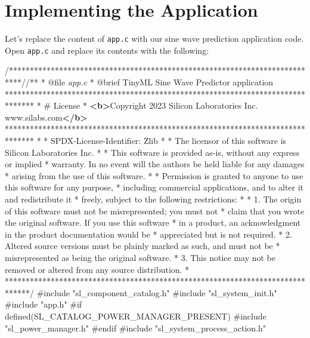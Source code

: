 \documentclass[
  9pt,
  letterpaper,
  abstract,
  titlepage]{scrbook}
\newenvironment{Shaded}{\begin{snugshade}}{\end{snugshade}}
\newcommand{\AnnotationTok}[1]{\textcolor[rgb]{0.37,0.37,0.37}{#1}}
\newcommand{\CommentTok}[1]{\textcolor[rgb]{0.37,0.37,0.37}{#1}}
\newcommand{\CommentVarTok}[1]{\textcolor[rgb]{0.37,0.37,0.37}{\textit{#1}}}
\newcommand{\ImportTok}[1]{\textcolor[rgb]{0.00,0.46,0.62}{#1}}
\newcommand{\KeywordTok}[1]{\textcolor[rgb]{0.00,0.23,0.31}{\textbf{#1}}}
\newcommand{\PreprocessorTok}[1]{\textcolor[rgb]{0.68,0.00,0.00}{#1}}
\begin{document}
\section{Implementing the
Application}\label{implementing-the-application}

Let's replace the content of \texttt{app.c} with our sine wave
prediction application code. Open \texttt{app.c} and replace its
contents with the following:

\begin{Shaded}
\begin{Highlighting}[]
\CommentTok{/***************************************************************************//**}
\CommentTok{ * }\AnnotationTok{@file}\CommentTok{ }\CommentVarTok{app.c}
\CommentTok{ * }\AnnotationTok{@brief}\CommentTok{ TinyML Sine Wave Predictor application}
\CommentTok{ *******************************************************************************}
\CommentTok{ * \# License}
\CommentTok{ * }\KeywordTok{\textless{}b\textgreater{}}\CommentTok{Copyright 2023 Silicon Laboratories Inc. www.silabs.com}\KeywordTok{\textless{}/b\textgreater{}}
\CommentTok{ *******************************************************************************}
\CommentTok{ *}
\CommentTok{ * }\AnnotationTok{SPDX{-}License{-}Identifier:}\CommentTok{ Zlib}
\CommentTok{ *}
\CommentTok{ * The licensor of this software is Silicon Laboratories Inc.}
\CommentTok{ *}
\CommentTok{ * This software is provided \textquotesingle{}as{-}is\textquotesingle{}, without any express or implied}
\CommentTok{ * warranty. In no event will the authors be held liable for any damages}
\CommentTok{ * arising from the use of this software.}
\CommentTok{ *}
\CommentTok{ * Permission is granted to anyone to use this software for any purpose,}
\CommentTok{ * including commercial applications, and to alter it and redistribute it}
\CommentTok{ * freely, subject to the following restrictions:}
\CommentTok{ *}
\CommentTok{ * 1. The origin of this software must not be misrepresented; you must not}
\CommentTok{ *    claim that you wrote the original software. If you use this software}
\CommentTok{ *    in a product, an acknowledgment in the product documentation would be}
\CommentTok{ *    appreciated but is not required.}
\CommentTok{ * 2. Altered source versions must be plainly marked as such, and must not be}
\CommentTok{ *    misrepresented as being the original software.}
\CommentTok{ * 3. This notice may not be removed or altered from any source distribution.}
\CommentTok{ *}
\CommentTok{ ******************************************************************************/}
\PreprocessorTok{\#include }\ImportTok{"sl\_component\_catalog.h"}
\PreprocessorTok{\#include }\ImportTok{"sl\_system\_init.h"}
\PreprocessorTok{\#include }\ImportTok{"app.h"}
\PreprocessorTok{\#if defined(SL\_CATALOG\_POWER\_MANAGER\_PRESENT)}
\PreprocessorTok{\#include }\ImportTok{"sl\_power\_manager.h"}
\PreprocessorTok{\#endif}
\PreprocessorTok{\#include }\ImportTok{"sl\_system\_process\_action.h"}


\end{Highlighting}
\end{Shaded}
\end{document}
